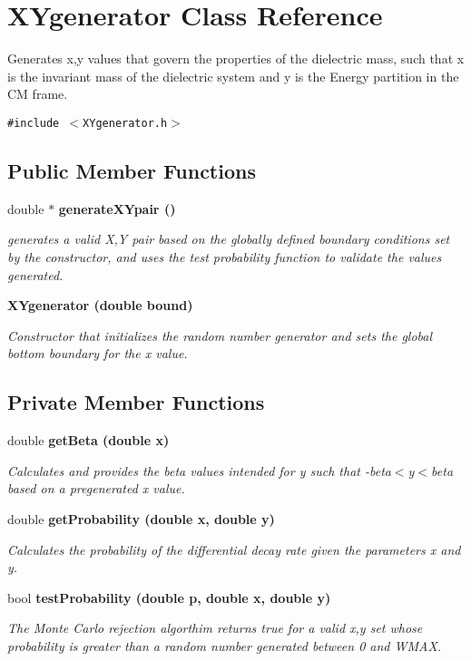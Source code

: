 \section{XYgenerator Class Reference}
\label{classXYgenerator}
Generates x,y values that govern the properties of the dielectric mass, such that x is the invariant mass of the dielectric system and y is the Energy partition in the CM frame.  


{\tt \#include $<$XYgenerator.h$>$}

\subsection*{Public Member Functions}
\begin{CompactItemize}
\item 
double $\ast$ \bf{generate\-XYpair} ()
\begin{CompactList}\small\item\em generates a valid X,Y pair based on the globally defined boundary conditions set by the constructor, and uses the test probability function to validate the values generated. \item\end{CompactList}\item 
\bf{XYgenerator} (double bound)
\begin{CompactList}\small\item\em Constructor that initializes the random number generator and sets the global bottom boundary for the x value. \item\end{CompactList}\end{CompactItemize}
\subsection*{Private Member Functions}
\begin{CompactItemize}
\item 
double \bf{get\-Beta} (double x)
\begin{CompactList}\small\item\em Calculates and provides the beta values intended for y such that -beta$<$y$<$beta based on a pregenerated x value. \item\end{CompactList}\item 
double \bf{get\-Probability} (double x, double y)
\begin{CompactList}\small\item\em Calculates the probability of the differential decay rate given the parameters x and y. \item\end{CompactList}\item 
bool \bf{test\-Probability} (double p, double x, double y)
\begin{CompactList}\small\item\em The Monte Carlo rejection algorthim returns true for a valid x,y set whose probability is greater than a random number generated between 0 and WMAX. \item\end{CompactList}\end{CompactItemize}
